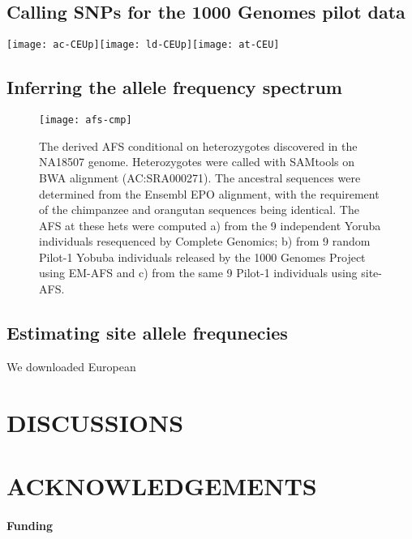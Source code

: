 \documentclass{bioinfo}
\begin{document}
\subsection{Calling SNPs for the 1000 Genomes pilot data}
\begin{figure*}[!htb]
\centering
\texttt{[image: ac-CEUp]}\texttt{[image: ld-CEUp]}\texttt{[image: at-CEU]}
\end{figure*}

\subsection{Inferring the allele frequency spectrum}
\begin{figure}[!htb]
\centering
\texttt{[image: afs-cmp]}
\caption{The derived AFS conditional on heterozygotes discovered in the NA18507
genome. Heterozygotes were called with SAMtools on BWA alignment
(AC:SRA000271).  The ancestral sequences were determined from the Ensembl EPO
alignment, with the requirement of the chimpanzee and orangutan sequences being
identical.  The AFS at these hets were computed a) from the 9 independent Yoruba
individuals resequenced by Complete Genomics; b) from 9 random Pilot-1 Yobuba
individuals released by the 1000 Genomes Project using EM-AFS and c) from the
same 9 Pilot-1 individuals using site-AFS.}
\end{figure}

\subsection{Estimating site allele frequnecies}
We downloaded European 

\section{DISCUSSIONS}

\section*{ACKNOWLEDGEMENTS}
\paragraph{Funding\textcolon}

\end{document}
